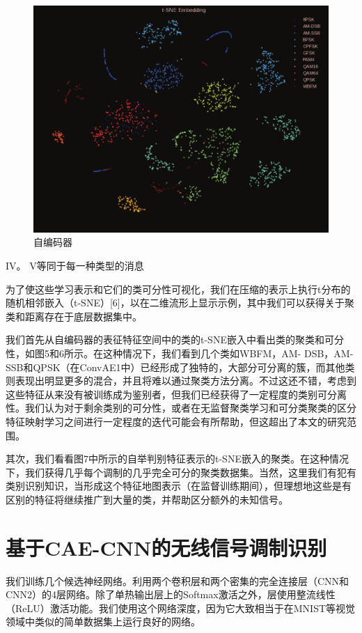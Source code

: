 \begin{figure}[!h]
	\centering
	\includegraphics[scale=0.2]{figures/chapter_3/surprised_fea}
	\caption{自编码器}	\label{fig_3_2}
\end{figure}

IV。 V等同于每一种类型的消息\par
为了使这些学习表示和它们的类可分性可视化，我们在压缩的表示上执行t分布的随机相邻嵌入（t-SNE）[6]，以在二维流形上显示示例，其中我们可以获得关于聚类和距离存在于底层数据集中。\par
我们首先从自编码器的表征特征空间中的类的t-SNE嵌入中看出类的聚类和可分性，如图5和6所示。在这种情况下，我们看到几个类如WBFM，AM- DSB，AM-SSB和QPSK（在ConvAE1中）已经形成了独特的，大部分可分离的簇，而其他类则表现出明显更多的混合，并且将难以通过聚类方法分离。不过这还不错，考虑到这些特征从来没有被训练成为鉴别者，但我们已经获得了一定程度的类别可分离性。我们认为对于剩余类别的可分性，或者在无监督聚类学习和可分类聚类的区分特征映射学习之间进行一定程度的迭代可能会有所帮助，但这超出了本文的研究范围。\par
其次，我们看看图7中所示的自举判别特征表示的t-SNE嵌入的聚类。在这种情况下，我们获得几乎每个调制的几乎完全可分的聚类数据集。当然，这里我们有犯有类别识别知识，当形成这个特征地图表示（在监督训练期间），但理想地这些是有区别的特征将继续推广到大量的类，并帮助区分额外的未知信号。\par


\section{基于CAE-CNN的无线信号调制识别}
我们训练几个候选神经网络。利用两个卷积层和两个密集的完全连接层（CNN和CNN2）的4层网络。除了单热输出层上的Softmax激活之外，层使用整流线性（ReLU）激活功能。我们使用这个网络深度，因为它大致相当于在MNIST等视觉领域中类似的简单数据集上运行良好的网络。\par 

